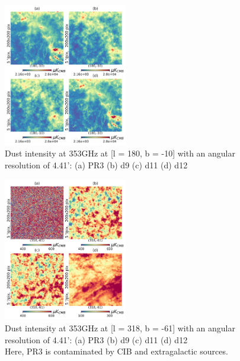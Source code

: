 \documentclass[twocolumn]{aastex631}
\begin{document}
\begin{figure}[ht!]
    \centering
    \includegraphics[width=0.48\textwidth]{figures/gal_plane_non_smooth_wo_zero_lvl.png}
\caption{Dust intensity at 353GHz at [l = 180, b = -10] with an angular resolution of 4.41': (a) PR3 (b) d9 (c) d11 (d) d12}    
\label{fig:353_int_gal_plane}
\end{figure}
\begin{figure}[ht!]
    \centering
    \includegraphics[width=0.48\textwidth]{figures/BK_non_smooth_wo_zero_lvl.png}
    \caption{Dust intensity at 353GHz at [l = 318, b = -61] with an angular resolution of 4.41': (a) PR3 (b) d9 (c) d11 (d) d12\\ Here, PR3 is contaminated by CIB and extragalactic sources.}
    \label{fig:353_int_BK}
\end{figure}
\end{document}
